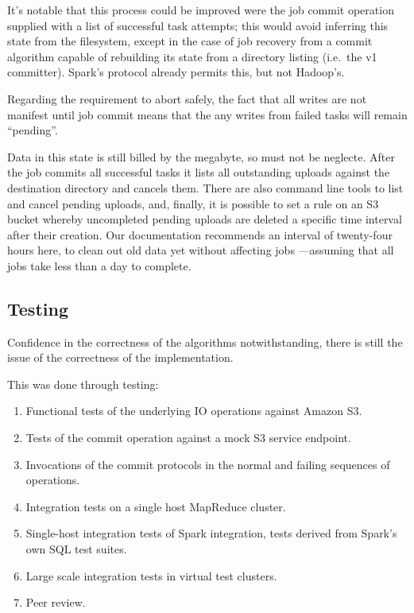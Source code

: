 \documentclass[conference]{IEEEtran}
\begin{document}
It's notable that this process could be improved were the job commit
operation supplied with a list of successful task attempts;
this would avoid inferring this state from the filesystem, except in
the case of job recovery from a commit algorithm capable of
rebuilding its state from a directory listing (i.e.\ the v1 committer).
Spark's protocol already permits this, but not Hadoop's.

Regarding the requirement to abort safely, the fact that all writes are
not manifest until job commit means that the any writes from failed tasks
will remain ``pending''.

Data in this state is still billed by the megabyte, so must not be neglecte.
After the job commits all successful tasks it lists all outstanding
uploads against the destination directory and cancels them.
There are also command line tools to list and cancel pending uploads,
and, finally, it is possible to set a rule on an S3 bucket whereby uncompleted
pending uploads are deleted a specific time interval after their creation.
Our documentation recommends an interval of twenty-four hours here, to
clean out old data yet without affecting jobs ---assuming that all jobs
take less than a day to complete.


\subsection{Testing}\label{subsec:testing}



Confidence in the correctness of the algorithms notwithstanding, there
is still the issue of the correctness of the implementation.


This was done through testing:

\begin{enumerate}
  \item Functional tests of the underlying IO operations against Amazon S3.
  \item Tests of the commit operation against a mock S3 service endpoint.
  \item Invocations of the commit protocols in the normal and failing sequences of operations.
  \item Integration tests on a single host MapReduce cluster.
  \item Single-host integration tests of Spark integration, tests derived from Spark's own SQL test suites.
  \item Large scale integration tests in virtual test clusters.
  \item Peer review.
\end{enumerate}
\end{document}
